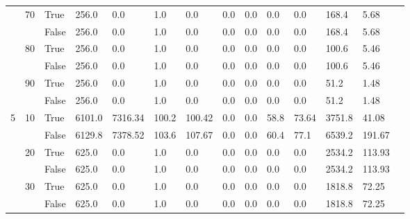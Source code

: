 \begin{landscape}
\begin{small}
\begin{longtable}[c]{@{}lll|ll|ll|ll|ll|lll@{}}
   & 70 & True  & 256.0           & 0.0            & 1.0           & 0.0           & 0.0           & 0.0           & 0.0           & 0.0           & 168.4         & 5.68        &  \\
   &    & False & 256.0           & 0.0            & 1.0           & 0.0           & 0.0           & 0.0           & 0.0           & 0.0           & 168.4         & 5.68        &  \\
   & 80 & True  & 256.0           & 0.0            & 1.0           & 0.0           & 0.0           & 0.0           & 0.0           & 0.0           & 100.6         & 5.46        &  \\
   &    & False & 256.0           & 0.0            & 1.0           & 0.0           & 0.0           & 0.0           & 0.0           & 0.0           & 100.6         & 5.46        &  \\
   & 90 & True  & 256.0           & 0.0            & 1.0           & 0.0           & 0.0           & 0.0           & 0.0           & 0.0           & 51.2          & 1.48        &  \\
   &    & False & 256.0           & 0.0            & 1.0           & 0.0           & 0.0           & 0.0           & 0.0           & 0.0           & 51.2          & 1.48        &  \\
  \midrule
5  & 10 & True  & 6101.0          & 7316.34        & 100.2         & 100.42        & 0.0           & 0.0           & 58.8          & 73.64         & 3751.8        & 41.08       &  \\
   &    & False & 6129.8          & 7378.52        & 103.6         & 107.67        & 0.0           & 0.0           & 60.4          & 77.1          & 6539.2        & 191.67      &  \\
   & 20 & True  & 625.0           & 0.0            & 1.0           & 0.0           & 0.0           & 0.0           & 0.0           & 0.0           & 2534.2        & 113.93      &  \\
   &    & False & 625.0           & 0.0            & 1.0           & 0.0           & 0.0           & 0.0           & 0.0           & 0.0           & 2534.2        & 113.93      &  \\
   & 30 & True  & 625.0           & 0.0            & 1.0           & 0.0           & 0.0           & 0.0           & 0.0           & 0.0           & 1818.8        & 72.25       &  \\
   &    & False & 625.0           & 0.0            & 1.0           & 0.0           & 0.0           & 0.0           & 0.0           & 0.0           & 1818.8        & 72.25       &  \\

\end{longtable}
\end{small}
\end{landscape}
